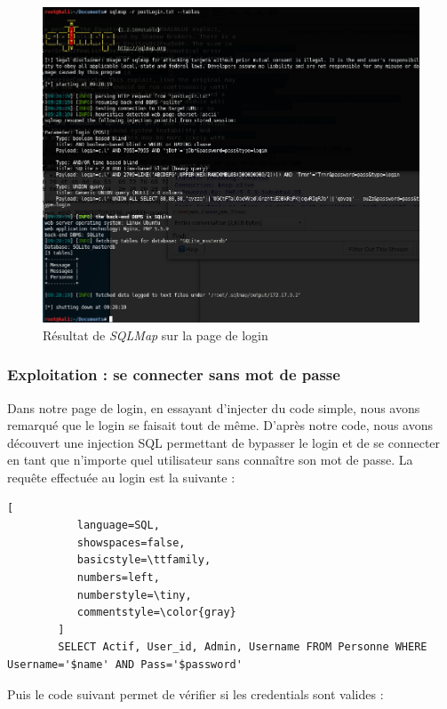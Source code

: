 \documentclass[12pt]{article}
\begin{document}
\begin{figure}[H]
\centering
\includegraphics[width=\linewidth]{images/sqli.png}
\caption{Résultat de \textit{SQLMap} sur la page de login}
\end{figure}

\subsubsection{Exploitation : se connecter sans mot de passe}
Dans notre page de login, en essayant d'injecter du code simple, nous avons remarqué que le login se faisait tout de même. D'après notre code, nous avons découvert une injection SQL permettant de bypasser le login et de se connecter en tant que n'importe quel utilisateur sans connaître son mot de passe. La requête effectuée au login est la suivante :

\begin{lstlisting}[
           language=SQL,
           showspaces=false,
           basicstyle=\ttfamily,
           numbers=left,
           numberstyle=\tiny,
           commentstyle=\color{gray}
        ]
        SELECT Actif, User_id, Admin, Username FROM Personne WHERE Username='$name' AND Pass='$password'
\end{lstlisting}

Puis le code suivant permet de vérifier si les credentials sont valides : 
\end{document}
